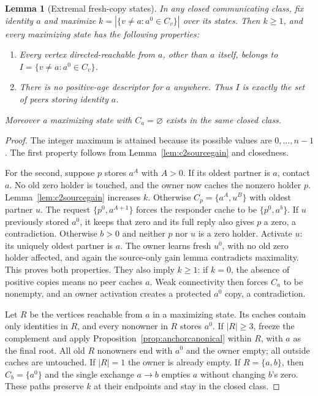 \documentclass[11pt]{article}
\newtheorem{lemma}[theorem]{Lemma}
\begin{document}
\begin{lemma}[Extremal fresh-copy states]
\label{lem:c2extremal}
In any closed communicating class, fix identity $a$ and
maximize $k=|\{v\ne a:a^0\in C_v\}|$ over its states.
Then $k\ge1$, and every maximizing state has the following
properties:
\begin{enumerate}
\item Every vertex directed-reachable from $a$, other
than $a$ itself, belongs to $I=\{v\ne a:a^0\in C_v\}$.
\item There is no positive-age descriptor for $a$ anywhere.
Thus $I$ is exactly the set of peers storing identity $a$.
\end{enumerate}
Moreover a maximizing state with $C_a=\varnothing$ exists
in the same closed class.
\end{lemma}
\begin{proof}
The integer maximum is attained because its possible
values are $0,\ldots,n-1$. The first property follows from
Lemma~\ref{lem:c2sourcegain} and closedness.

For the second, suppose $p$ stores $a^A$ with $A>0$.
If its oldest partner is $a$, contact $a$. No old zero
holder is touched, and the owner now caches the nonzero
holder $p$. Lemma~\ref{lem:c2sourcegain} increases $k$.
Otherwise $C_p=\{a^A,u^B\}$ with oldest partner $u$.
The request $\{p^0,a^{A+1}\}$ forces the responder cache
to be $\{p^0,a^b\}$. If $u$ previously stored $a^0$,
it keeps that zero and its full reply also gives $p$ a
zero, a contradiction. Otherwise $b>0$ and neither $p$
nor $u$ is a zero holder. Activate $u$: its uniquely
oldest partner is $a$. The owner learns fresh $u^0$,
with no old zero holder affected, and again the source-only
gain lemma contradicts maximality. This proves both properties.
They also imply $k\ge1$: if $k=0$, the absence of positive
copies means no peer caches $a$. Weak connectivity then
forces $C_a$ to be nonempty, and an owner activation
creates a protected $a^0$ copy, a contradiction.

Let $R$ be the vertices reachable from $a$ in a maximizing
state. Its caches contain only identities in $R$, and
every nonowner in $R$ stores $a^0$. If $|R|\ge3$, freeze
the complement and apply Proposition~\ref{prop:anchorcanonical}
within $R$, with $a$ as the final root. All old $R$
nonowners end with $a^0$ and the owner empty; all outside
caches are untouched. If $|R|=1$ the owner is already
empty. If $R=\{a,b\}$, then $C_b=\{a^0\}$ and the
single exchange $a\to b$ empties $a$ without changing
$b$'s zero. These paths preserve $k$ at their endpoints
and stay in the closed class.
\end{proof}
\end{document}
